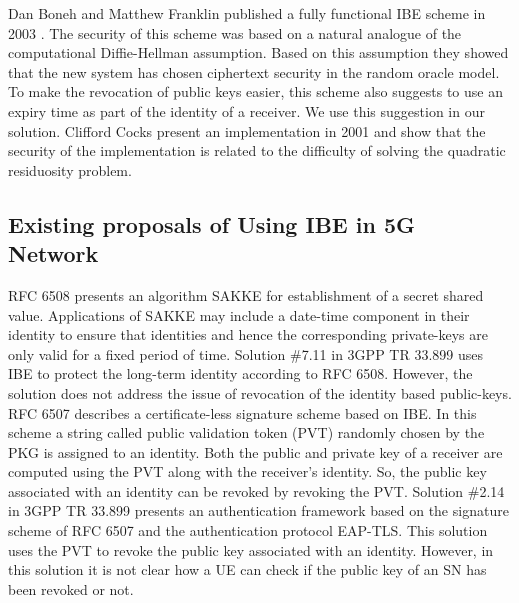 \documentclass{llncs} %
\begin{document}
Dan Boneh and Matthew Franklin published a fully functional IBE scheme in 2003 \cite{IBE_boneh_franklin}. The security of this scheme was based on a natural analogue of the computational Diffie-Hellman assumption. Based on this assumption they showed that the new system has chosen ciphertext security in the random oracle model. To make the revocation of public keys easier, this scheme also suggests to use an expiry time as part of the identity of a receiver. We use this suggestion in our solution. Clifford Cocks present an implementation in 2001 \cite{IBE_clifford} and show that the security of the implementation is related to the difficulty of solving the quadratic residuosity problem.


\subsection{Existing proposals of Using IBE in 5G Network}
RFC 6508 \cite{RFC6508} presents an algorithm SAKKE for establishment of a secret shared value. Applications of SAKKE may include a date-time component in their identity to ensure that identities and hence the corresponding private-keys are only valid for a fixed period of time. Solution \#7.11 in 3GPP TR 33.899 \cite{TR33899} uses IBE to protect the long-term identity according to RFC 6508. However, the solution does not address the issue of revocation of the identity based public-keys. RFC 6507 \cite{RFC6507} describes a certificate-less signature scheme based on IBE. In this scheme a string called public validation token (PVT) randomly chosen by the PKG is assigned to an identity. Both the public and private key of a receiver are computed using the PVT along with the receiver's identity. So, the public key associated with an identity can be revoked by revoking the PVT. Solution \#2.14 in 3GPP TR 33.899 presents an authentication framework based on the signature scheme of RFC 6507 and the authentication protocol EAP-TLS. This solution uses the PVT to revoke the public key associated with an identity. However, in this solution it is not clear how a UE can check if the public key of an SN has been revoked or not.
\end{document}
